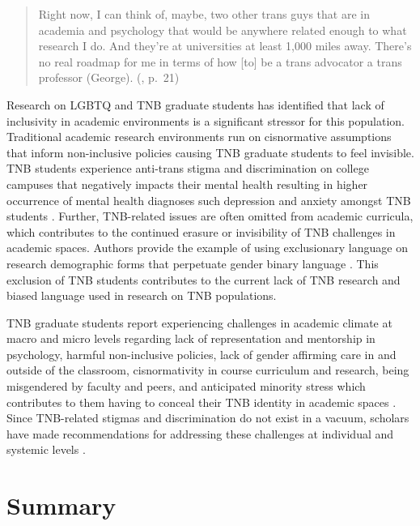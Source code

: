 \documentclass[
  11pt,
]{book}
\begin{document}
\begin{quote}
Right now, I can think of, maybe, two other trans guys that are in academia and psychology that would be anywhere related enough to what research I do. And they're at universities at least 1,000 miles away. There's no real roadmap for me in terms of how {[}to{]} be a trans advocator a trans professor (George). (\citet{matsuno_theres_2022}, p.~21)
\end{quote}

Research on LGBTQ and TNB graduate students has identified that lack of inclusivity in academic environments is a significant stressor for this population. Traditional academic research environments run on cisnormative assumptions that inform non-inclusive policies causing TNB graduate students to feel invisible. TNB students experience anti-trans stigma and discrimination on college campuses that negatively impacts their mental health resulting in higher occurrence of mental health diagnoses such depression and anxiety amongst TNB students \citep{knutson_advocating_2022, lipson_gender_2019, messman_transgender_2019}. Further, TNB-related issues are often omitted from academic curricula, which contributes to the continued erasure or invisibility of TNB challenges in academic spaces. Authors provide the example of using exclusionary language on research demographic forms that perpetuate gender binary language \citep{knutson_advocating_2022}. This exclusion of TNB students contributes to the current lack of TNB research and biased language used in research on TNB populations.

TNB graduate students report experiencing challenges in academic climate at macro and micro levels regarding lack of representation and mentorship in psychology, harmful non-inclusive policies, lack of gender affirming care in and outside of the classroom, cisnormativity in course curriculum and research, being misgendered by faculty and peers, and anticipated minority stress which contributes to them having to conceal their TNB identity in academic spaces \citep{matsuno_theres_2022}. Since TNB-related stigmas and discrimination do not exist in a vacuum, scholars have made recommendations for addressing these challenges at individual and systemic levels .

\section{Summary}\label{summary}
\end{document}
